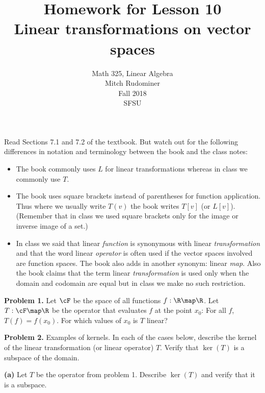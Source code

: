 \documentclass[oneside,12pt]{amsart}
\begin{document}
\title{Homework for Lesson 10 \\ Linear transformations on vector spaces}
\author{Math 325, Linear Algebra \\ Mitch Rudominer \\ Fall 2018 \\ SFSU }
\date{}

\maketitle

Read Sections 7.1 and 7.2 of the textbook. But watch out for the following
differences in notation and terminology between the book and the class notes:
\begin{itemize}
\item The book commonly uses $L$ for linear transformations whereas in class
we commonly use $T$.
\item The book uses square brackets instead of parentheses for function application.
Thus where we usually write $T(v)$ the book writes $T[v]$ (or $L[v]$).
(Remember that in class we used square brackets only for the image or inverse
image of a set.)
\item In class we said that linear \emph{function} is synonymous with linear
\emph{transformation} and that the word linear \emph{operator} is often used
if the vector spaces involved are function spaces. The book also adds in
another synonym: linear \emph{map}. Also the book claims that the term
linear \emph{transformation} is used only when the domain and codomain are
equal but in class we make no such restriction.
\end{itemize}

\bigskip

\textbf{Problem 1.} Let $\cF$ be the space of all functions $f:\R\map\R$.
Let $T:\cF\map\R$ be the operator that evaluates $f$ at the point $x_0$:
For all $f$, $T(f) = f(x_0)$. For which values of $x_0$ is $T$ linear?

\bigskip
\bigskip
\bigskip
\bigskip
\bigskip
\bigskip
\bigskip
\bigskip
\bigskip
\bigskip


\textbf{Problem 2.} Examples of kernels. In each of the cases below,
describe the kernel of the linear transformation (or linear operator) $T$.
Verify that $\ker(T)$ is a subspace of the domain.

\textbf{(a)} Let $T$ be the operator from problem 1. Describe $\ker(T)$ and
verify that it is a subspace.

\bigskip
\bigskip
\bigskip
\bigskip
\bigskip
\bigskip
\bigskip
\bigskip
\bigskip
\bigskip
\end{document}
